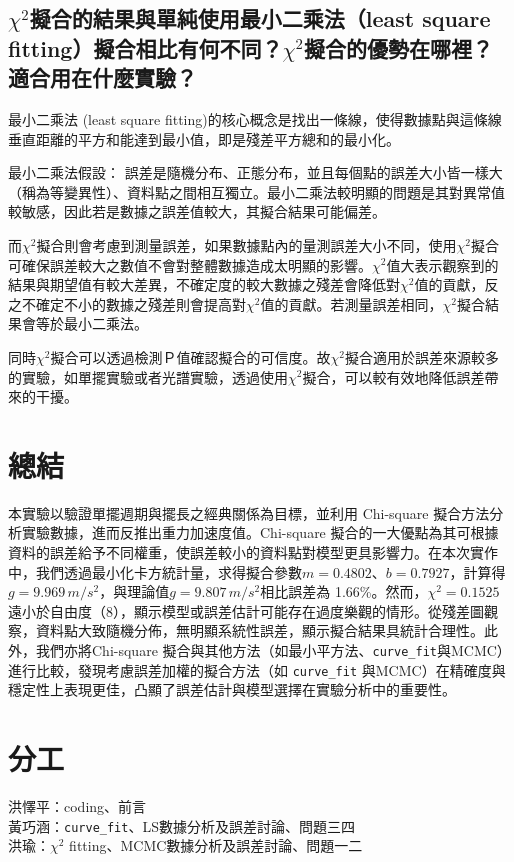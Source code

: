 \documentclass[12pt,a4paper]{article}
\begin{document}
\begin{CJK}{UTF8}{bkai}
\subsection{$\chi^2$擬合的結果與單純使用最小二乘法（least square fitting）擬合相比有何不同？$\chi^2$擬合的優勢在哪裡？適合用在什麼實驗？}
\hfill

最小二乘法 (least square fitting)的核心概念是找出一條線，使得數據點與這條線垂直距離的平方和能達到最小值，即是殘差平方總和的最小化。

最小二乘法假設：
誤差是隨機分布、正態分布，並且每個點的誤差大小皆一樣大（稱為等變異性）、資料點之間相互獨立。最小二乘法較明顯的問題是其對異常值較敏感，因此若是數據之誤差值較大，其擬合結果可能偏差。

而$\chi^2$擬合則會考慮到測量誤差，如果數據點內的量測誤差大小不同，使用$\chi^2$擬合可確保誤差較大之數值不會對整體數據造成太明顯的影響。$\chi^2$值大表示觀察到的結果與期望值有較大差異，不確定度的較大數據之殘差會降低對$\chi^2$值的貢獻，反之不確定不小的數據之殘差則會提高對$\chi^2$值的貢獻。若測量誤差相同，$\chi^2$擬合結果會等於最小二乘法。

同時$\chi^2$擬合可以透過檢測Ｐ值確認擬合的可信度。故$\chi^2$擬合適用於誤差來源較多的實驗，如單擺實驗或者光譜實驗，透過使用$\chi^2$擬合，可以較有效地降低誤差帶來的干擾。



\section{總結}
\hfill

本實驗以驗證單擺週期與擺長之經典關係為目標，並利用 Chi-square 擬合方法分析實驗數據，進而反推出重力加速度值。Chi-square 擬合的一大優點為其可根據資料的誤差給予不同權重，使誤差較小的資料點對模型更具影響力。在本次實作中，我們透過最小化卡方統計量，求得擬合參數$m=0.4802$、$b=0.7927$，計算得$g=9.969 \,m/s^2$，與理論值$g=9.807 \,m/s^2$相比誤差為 1.66\%。然而，$\chi^2=0.1525$ 遠小於自由度（8），顯示模型或誤差估計可能存在過度樂觀的情形。從殘差圖觀察，資料點大致隨機分佈，無明顯系統性誤差，顯示擬合結果具統計合理性。此外，我們亦將Chi-square 擬合與其他方法（如最小平方法、\texttt{curve\_fit}與MCMC）進行比較，發現考慮誤差加權的擬合方法（如 \texttt{curve\_fit} 與MCMC）在精確度與穩定性上表現更佳，凸顯了誤差估計與模型選擇在實驗分析中的重要性。

\clearpage

\section{分工}

洪懌平：coding、前言\\
黃巧涵：\texttt{curve\_fit}、LS數據分析及誤差討論、問題三四\\
洪瑜：$\chi^2$ fitting、MCMC數據分析及誤差討論、問題一二


\end{CJK}
\end{document}
